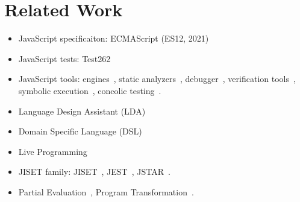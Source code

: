 \section{Related Work}\label{sec:related}

\begin{itemize}
  \item JavaScript specificaiton: ECMAScript (ES12, 2021)~\cite{es12}
  \item JavaScript tests: Test262~\cite{test262}
  \item JavaScript tools: engines~\cite{v8, jscore, chakra, spidermonkey},
    static analyzers~\cite{safe, safe2, tajs, wala, jsai},
    debugger~\cite{jsexplain}, verification tools~\cite{javert, javert2,
    ad-safety, javanni}, symbolic execution~\cite{symbolic-js, sym-js, expo-se},
    concolic testing~\cite{jalangi, type-conc-test}.
  \item Language Design Assistant (LDA)~\cite{lda, lisa, ipld, asf-sdf,
    meta-env, faustine}
  \item Domain Specific Language (DSL)~\cite{dsl-survey, dsl-survey2}
  \item Live Programming~\cite{omnicode, situ-vis, proj-box}
  \item JISET family: JISET~\cite{jiset}, JEST~\cite{jest}, JSTAR~\cite{jstar}.
  \item Partial Evaluation~\cite{peval, peval-survey}, Program
    Transformation~\cite{trans-ai}.
\end{itemize}

\todo
